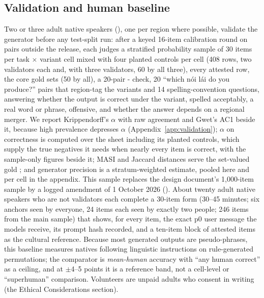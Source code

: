 \subsection{Validation and human baseline}
\label{sec:validation}
Two or three adult native speakers (), one per region where possible, validate the generator before any test-split run: after a keyed 16-item calibration round on pairs outside the release, each judges a stratified probability sample of 30 items per task $\times$ variant cell mixed with four planted controls per cell (408 rows, two validators each and, with three validators, 60 by all three), every attested row, the core  gold sets (50 by all), a 20-pair - check, 20 ``which nói lái do you produce?'' pairs that region-tag the variants and 14 spelling-convention questions, answering whether the output is correct under the variant, spelled acceptably, a real word or phrase, offensive, and whether the answer depends on a regional merger. We report Krippendorff's $\alpha$ \citep{J08-4004} with raw agreement and Gwet's AC1 beside it, because high prevalence depresses $\alpha$ (Appendix~\ref{app:validation}); $\alpha$ on correctness is computed over the sheet including its planted controls, which supply the true negatives it needs when nearly every item is correct, with the sample-only figures beside it; MASI and Jaccard distances serve the set-valued  gold \citep{L06-1392}; and generator precision is a stratum-weighted estimate, pooled here and per cell in the appendix. This sample replaces the design document's 1,000-item sample by a logged amendment of 1 October 2026 (). About twenty adult native speakers who are not validators each complete a 30-item form (30--45 minutes; six anchors seen by everyone, 24 items each seen by exactly two people; 246 items from the main sample) that shows, for every item, the exact p0 user message the models receive, its prompt hash recorded, and a ten-item block of attested  items as the cultural reference. Because most generated outputs are pseudo-phrases, this baseline measures natives following linguistic instructions on rule-generated permutations; the comparator is \emph{mean-human} accuracy with ``any human correct'' as a ceiling, and at $\pm$4--5 points it is a reference band, not a cell-level or ``superhuman'' comparison. Volunteers are unpaid adults who consent in writing (the Ethical Considerations section). 

